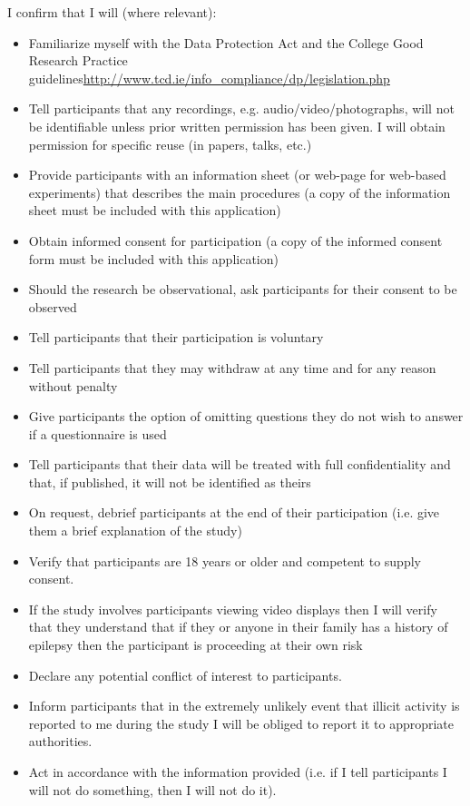 I confirm that I will (where relevant):
\begin{itemize}
    \item Familiarize myself with the Data Protection Act and the College Good Research Practice guidelines\newline\url{http://www.tcd.ie/info_compliance/dp/legislation.php}
    \item Tell participants that any recordings, e.g. audio/video/photographs, will not be identifiable unless prior written permission has been given. I will obtain permission for specific reuse (in papers, talks, etc.)
    \item Provide participants with an information sheet (or web-page for web-based experiments) that describes the main procedures (a copy of the information sheet must be included with this application)
    \item Obtain informed consent for participation (a copy of the informed consent form must be included with this application)
    \item Should the research be observational, ask participants for their consent to be observed
    \item Tell participants that their participation is voluntary
    \item Tell participants that they may withdraw at any time and for any reason without penalty
    \item Give participants the option of omitting questions they do not wish to answer if a questionnaire is used
    \item Tell participants that their data will be treated with full confidentiality and that, if published, it will not be identified as theirs
    \item On request, debrief participants at the end of their participation (i.e. give them a brief explanation of the study)
    \item Verify that participants are 18 years or older and competent to supply consent.
    \item If the study involves participants viewing video displays then I will verify that they understand that if they or anyone in their family has a history of epilepsy then the participant is proceeding at their own risk
    \item Declare any potential conflict of interest to participants.
    \item Inform participants that in the extremely unlikely event that illicit activity is reported to me during the study I will be obliged to report it to appropriate authorities.
    \item Act in accordance with the information provided (i.e. if I tell participants I will not do something, then I will not do it).
\end{itemize}

